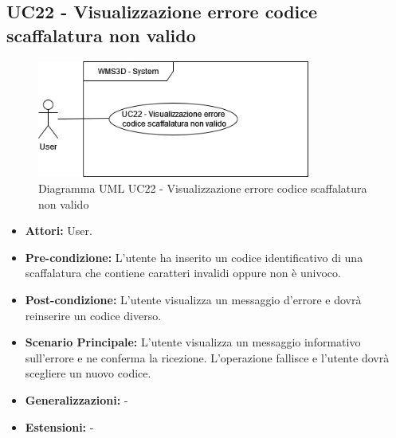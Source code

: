 \subsection{UC22 - Visualizzazione errore codice scaffalatura non valido}
\begin{figure}[H]
  \centering
  \includegraphics[width=0.8\textwidth]{UC_diagrams_21-26/UC22.drawio.png}
   \caption{Diagramma UML UC22 - Visualizzazione errore codice scaffalatura non valido}
\end{figure}
\begin{itemize}
    \item \textbf{Attori:} User.
    \item \textbf{Pre-condizione:}  L'utente ha inserito un codice identificativo di una scaffalatura che contiene caratteri invalidi oppure non è univoco.
    \item \textbf{Post-condizione:}  L'utente visualizza un messaggio d'errore e dovrà reinserire un codice diverso.
    \item \textbf{Scenario Principale:}  L'utente visualizza un messaggio informativo sull'errore e ne conferma la ricezione. L'operazione fallisce e l'utente dovrà scegliere un nuovo codice.
    \item \textbf{Generalizzazioni:} -
    \item \textbf{Estensioni:} -
\end{itemize}